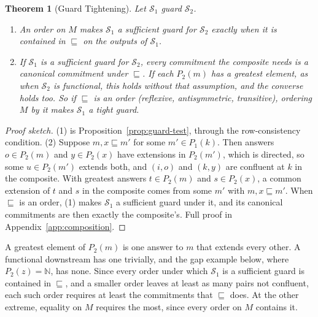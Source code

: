 \documentclass[sigconf]{cidr-2027}
\newtheorem{theorem}{Theorem}
\theoremstyle{remark}
\newcommand{\commitment}{commitment\xspace}
\newcommand{\commitments}{commitments\xspace}
\newcommand{\outrel}{extends\xspace}          %
\newcommand{\Spec}{\mathcal{S}}
\begin{document}
\begin{theorem}[Guard Tightening]
\label{thm:guard-tightening}
\textcolor{reviewed}{Let $\Spec_1$ guard $\Spec_2$.}
\begin{enumerate}
\item
\textcolor{reviewed}{An order on $M$ makes $\Spec_1$ a sufficient guard for $\Spec_2$
        exactly when it is contained in $\sqsubseteq$ on the outputs of
        $\Spec_1$.}
\item
If $\Spec_1$ is a sufficient guard for $\Spec_2$, every \commitment
        the composite needs is a canonical \commitment under $\sqsubseteq$. If each $P_2(m)$ has a greatest element, as when $\Spec_2$ is
        functional, this holds without that assumption, and the converse
        holds too. \textcolor{reviewed}{So if $\sqsubseteq$ is an
        order (reflexive, antisymmetric, transitive), ordering $M$ by it makes
        $\Spec_1$ a tight guard.}
\end{enumerate}
\end{theorem}

\begin{proof}[Proof sketch]
(1) is Proposition~\ref{prop:guard-test}, through the
row-consistency condition. (2) Suppose
$m,x\sqsubseteq m'$ for some $m'\in P_1(k)$. Then answers $o\in P_2(m)$ and
$y\in P_2(x)$ have extensions in $P_2(m')$, which is directed, so some
$u\in P_2(m')$ \outrel both, and $(i,o)$ and $(k,y)$ are confluent at $k$ in
the composite. With
greatest answers $t\in P_2(m)$ and $s\in P_2(x)$, a common extension of $t$
and $s$ in the composite comes from some $m'$ with $m,x\sqsubseteq m'$. When
$\sqsubseteq$ is an order, (1) makes $\Spec_1$ a sufficient guard under it,
and its canonical \commitments are then exactly the composite's. Full proof in
Appendix~\ref{app:composition}.
\end{proof}

A greatest element of $P_2(m)$ is one answer to $m$ that extends every
other. A functional downstream has one trivially, and the gap example below,
where $P_2(z)=\mathbb N$, has none. Since every order under which $\Spec_1$ is
a sufficient guard is contained in $\sqsubseteq$, and a smaller order leaves at least as many pairs not confluent, each such order requires at least the
\commitments that $\sqsubseteq$ does. At the other extreme, equality on $M$
requires the most, since every order on $M$ contains it.
\end{document}
